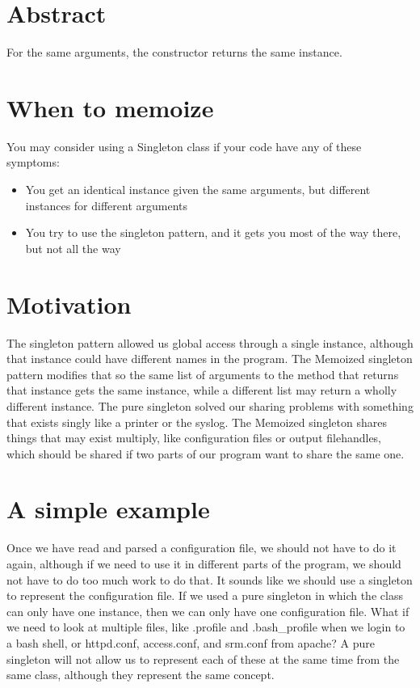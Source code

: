 
    \section{Abstract}

For the same arguments, the constructor returns the same instance.

    \section{When to memoize}
    
You may consider using a Singleton class if your code
have any of these symptoms:

\begin{itemize}
\item You get an identical instance given the same arguments,
but different instances for different arguments
\item You try to use the singleton pattern, and it gets you
most of the way there, but not all the way
\end{itemize}

    \section{Motivation}
    
The singleton pattern allowed us global access through a single
instance, although that instance could have different names in 
the program.  The Memoized singleton pattern modifies that so
the same list of arguments to the method that returns that
instance gets the same instance, while a different list may
return a wholly different instance.  The pure singleton solved
our sharing problems with something that exists singly like a
printer or the syslog.  The Memoized singleton shares things that
may exist multiply, like configuration files or output filehandles,
which should be shared if two parts of our program want to share
the same one.

    \section{A simple example}
    
Once we have read and parsed a configuration file, we should not
have to do it again, although if we need to use it in different
parts of the program, we should not have to do too much work
to do that.  It sounds like we should use a singleton to represent
the configuration file.  If we used a pure singleton in which the 
class can only have one instance, then we can only have one configuration
file.  What if we need to look at multiple files, like .profile and .bash\_profile
when we login to a bash shell, or httpd.conf, access.conf, and srm.conf
from apache?  A pure singleton will not allow us to represent each of
these at the same time from the same class, although they represent the
same concept.


